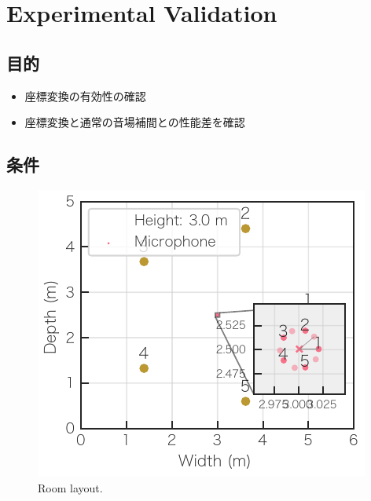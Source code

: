 \documentclass[sip,biber]{now-journal}
\begin{document}
\section{Experimental Validation}\label{sec:experiment}
\subsection*{目的}
\begin{itemize}
  \item 座標変換の有効性の確認
  \item 座標変換と通常の音場補間との性能差を確認
\end{itemize}

\subsection*{条件}
\begin{figure}[t]
  \centering
  \includegraphics{figures/room_layout.pdf}
  \caption{Room layout.}%
  \label{fig:layout}
\end{figure}
\end{document}
